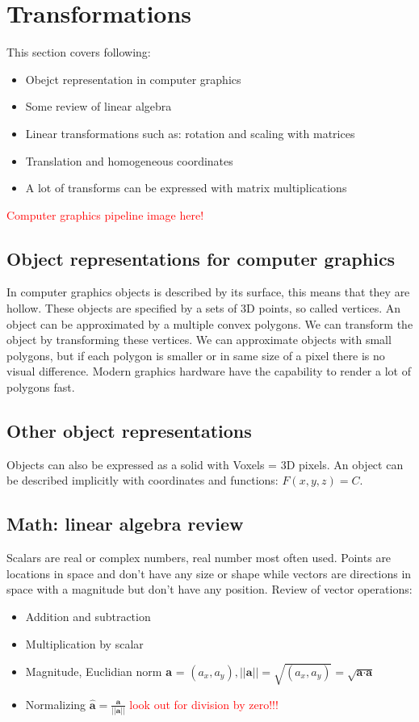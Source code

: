 \section{Transformations}
This section covers following:
\begin{itemize}
	\item Obejct representation in computer graphics
	\item Some review of linear algebra
	\item Linear transformations such as: rotation and scaling with matrices
	\item Translation and homogeneous coordinates
	\item A lot of transforms can be expressed with matrix multiplications
\end{itemize}


\textcolor{red}{Computer graphics pipeline image here!}

	\subsection*{Object representations for computer graphics}
	In computer graphics objects is described by its surface, this means that they are hollow. These objects are specified by a sets of 3D points, so called vertices. An object can be approximated by a multiple convex polygons. We can transform the object by transforming these vertices. We can approximate objects with small polygons, but if each polygon is smaller or in same size of a pixel there is no visual difference. Modern graphics hardware have the capability to render a lot of polygons fast. 

	\subsection*{Other object representations}
	Objects can also be expressed as a solid with Voxels = 3D pixels. An object can be described implicitly with coordinates and functions: $F(x,y,z) = C$.

	\subsection*{Math: linear algebra review}
	Scalars are real or complex numbers, real number most often used. Points are locations in space and don't have any size or shape while vectors are directions in space with a magnitude but don't have any position. Review of vector operations:

	\begin{itemize}
		\item Addition and subtraction
		\item Multiplication by scalar
		\item Magnitude, Euclidian norm \textbf{a} = $(a_x,a_y), ||\textbf{a}|| = \sqrt{(a_x,a_y)} = \sqrt{ \textbf{a} \cdot \textbf{a} }$
		\item Normalizing $\hat{\textbf{a}} = \frac{\textbf{a}} {||\textbf{a}||} $ \textcolor{red}{look out for division by zero!!!} 
	\end{itemize}

